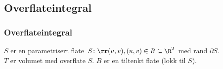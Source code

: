 \begin{frame}
  \subsection{Overflateintegral}
  \frametitle{Overflateintegral}
  \centerline{%
  }
  $S$ er en parametrisert flate $S \colon \rr(u,v), (u,v) \in R \subseteq \R^2$ med rand $\partial S$. \\ 
  $T$ er volumet med overflate $S$. $B$ er en tiltenkt flate (lokk til $S$).
\end{frame}

